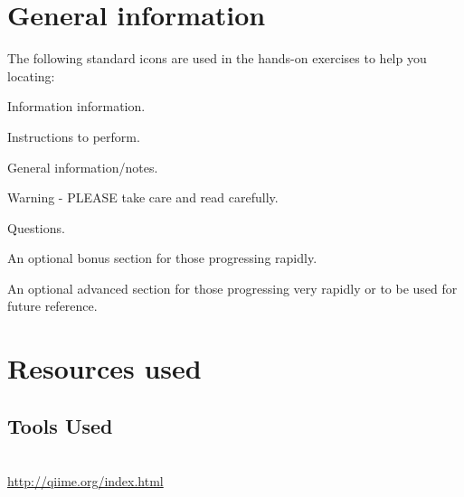 \documentclass[a4paper,12pt,twoside]{memoir}
\begin{document}
%
%
\workshoptitlepage

\section{General information}

The following standard icons are used in the hands-on exercises to help you locating:

\begin{information}
Information information.
\end{information}

\begin{steps}
Instructions to perform.
\end{steps}

\begin{note}
General information/notes.
\end{note}

\begin{warning}
Warning - PLEASE take care and read carefully.
\end{warning}

\begin{questions}
Questions.
\begin{answer}
Space to }answer questions.
\end{answer}
\end{questions}

\begin{bonus}
An optional bonus section for those progressing rapidly.
\end{bonus}

\begin{advanced}
An optional advanced section for those progressing very rapidly or to be used for future reference.
\end{advanced}

\section{Resources used}

\subsection{Tools Used}

\begin{description}[style=multiline,labelindent=0cm,align=left,leftmargin=0.5cm]
  \item[QIIME]\hfill\\
     \url{http://qiime.org/index.html}
\end{description}
\end{document}
